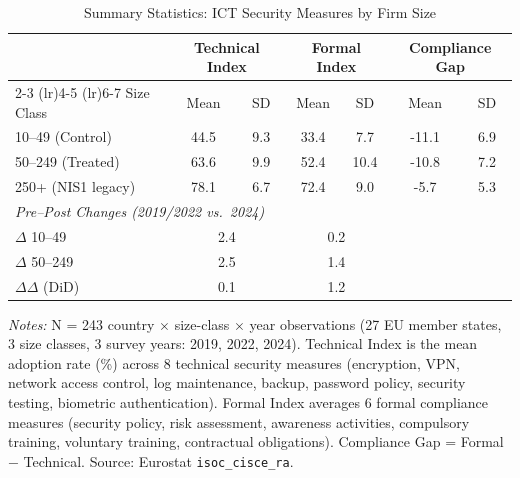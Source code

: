 \begin{table}[H]
\centering
\caption{Summary Statistics: ICT Security Measures by Firm Size}
\label{tab:summary}
\begin{threeparttable}
\begin{tabular}{lcccccc}
\toprule
 & \multicolumn{2}{c}{Technical Index} & \multicolumn{2}{c}{Formal Index} & \multicolumn{2}{c}{Compliance Gap} \\
\cmidrule(lr){2-3} \cmidrule(lr){4-5} \cmidrule(lr){6-7}
Size Class & Mean & SD & Mean & SD & Mean & SD \\
\midrule
10--49 (Control) & 44.5 & 9.3 & 33.4 & 7.7 & -11.1 & 6.9 \\
50--249 (Treated) & 63.6 & 9.9 & 52.4 & 10.4 & -10.8 & 7.2 \\
250+ (NIS1 legacy) & 78.1 & 6.7 & 72.4 & 9.0 & -5.7 & 5.3 \\
\midrule
\multicolumn{7}{l}{\textit{Pre--Post Changes (2019/2022 vs.\ 2024)}} \\
$\Delta$ 10--49 & \multicolumn{2}{c}{2.4} & \multicolumn{2}{c}{0.2} & & \\
$\Delta$ 50--249 & \multicolumn{2}{c}{2.5} & \multicolumn{2}{c}{1.4} & & \\
$\Delta\Delta$ (DiD) & \multicolumn{2}{c}{0.1} & \multicolumn{2}{c}{1.2} & & \\
\bottomrule
\end{tabular}
\begin{tablenotes}[flushleft]
\small
\item \textit{Notes:} N = 243 country $\times$ size-class $\times$ year observations (27 EU member states, 3 size classes, 3 survey years: 2019, 2022, 2024). Technical Index is the mean adoption rate (\%) across 8 technical security measures (encryption, VPN, network access control, log maintenance, backup, password policy, security testing, biometric authentication). Formal Index averages 6 formal compliance measures (security policy, risk assessment, awareness activities, compulsory training, voluntary training, contractual obligations). Compliance Gap = Formal $-$ Technical. Source: Eurostat \texttt{isoc\_cisce\_ra}.
\end{tablenotes}
\end{threeparttable}
\end{table}
